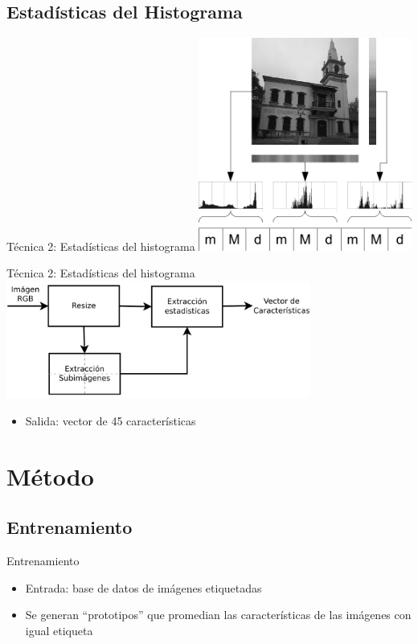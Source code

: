 \documentclass[spanish]{beamer}
\begin{document}
\subsection{Estadísticas del Histograma}
\begin{frame}{Técnica 2: Estadísticas del histograma}
  \includegraphics[width=7cm]{img/ext-histog}
\end{frame}
\begin{frame}{Técnica 2: Estadísticas del histograma}
  \includegraphics[width=10cm]{../diagramas/procesoestadisticas}
  \begin{itemize}
  \item Salida: vector de 45 características
  \end{itemize}
\end{frame}
%
\section{Método}
%
\subsection{Entrenamiento}
\begin{frame}{Entrenamiento}
  \begin{itemize}
  \item Entrada: base de datos de imágenes etiquetadas
  \item Se generan ``prototipos'' que promedian las características de las
    imágenes con igual etiqueta
  \end{itemize}
\end{frame}
%
\end{document}
